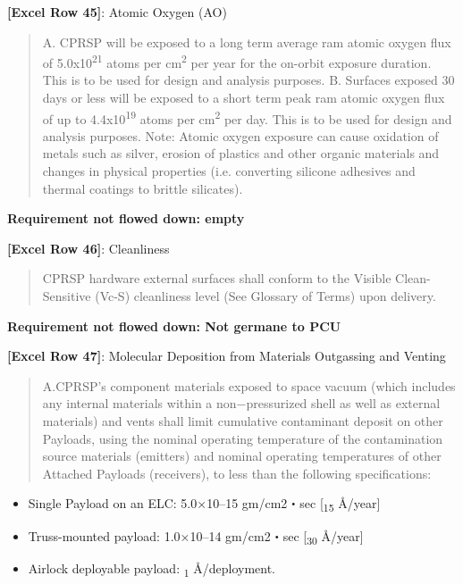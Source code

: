 \textbf{[Excel Row 45]}: Atomic Oxygen (AO)

\begin{quote}
A. CPRSP will be exposed to a long term average ram atomic oxygen flux of 5.0x10\textsuperscript{21} atoms per cm\textsuperscript{2} per year for the on-orbit exposure duration. This is to be used for design and analysis purposes. B. Surfaces exposed 30 days or less will be exposed to a short term peak ram atomic oxygen flux of up to 4.4x10\textsuperscript{19} atoms per cm\textsuperscript{2} per day. This is to be used for design and analysis purposes. Note: Atomic oxygen exposure can cause oxidation of metals such as silver, erosion of plastics and other organic materials and changes in physical properties (i.e. converting silicone adhesives and thermal coatings to brittle silicates).
\end{quote}

\textbf{Requirement not flowed down: empty}

\textbf{[Excel Row 46]}: Cleanliness

\begin{quote}
CPRSP hardware external surfaces shall conform to the Visible Clean-Sensitive (Vc-S) cleanliness level (See Glossary of Terms) upon delivery.
\end{quote}

\textbf{Requirement not flowed down: Not germane to PCU}

\textbf{[Excel Row 47]}: Molecular Deposition from Materials Outgassing and Venting

\begin{quote}
A.CPRSP's component materials exposed to space vacuum (which includes any internal materials within a non−pressurized shell as well as external materials) and vents shall limit cumulative contaminant deposit on other Payloads, using the nominal operating temperature of the contamination source materials (emitters) and nominal operating temperatures of other Attached Payloads (receivers), to less than the following specifications:
\end{quote}

\begin{itemize}
\item{} Single Payload on an ELC: 5.0×10--15 gm\slash cm2・sec [\textsubscript{15} Å\slash year]

\item{} Truss-mounted payload: 1.0×10--14 gm\slash cm2・sec [\textsubscript{30} Å\slash year]

\item{} Airlock deployable payload: \textsubscript{1} Å\slash deployment.

\end{itemize}

